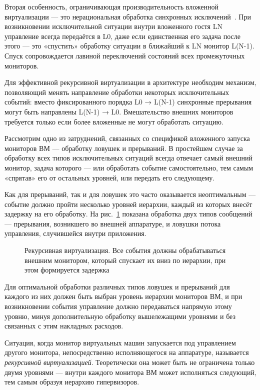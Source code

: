 Вторая особенность, ограничивающая производительность вложенной виртуализации — это нерациональная обработка синхронных исключений . При возникновении исключительной ситуации внутри вложенного гостя LN управление всегда передаётся в L0, даже если единственная его задача после этого — это «спустить» обработку ситуации в ближайший к LN монитор L(N-1). Спуск сопровождается лавиной переключений состояний всех промежуточных мониторов.


Для эффективной рекурсивной виртуализации в архитектуре необходим механизм, позволяющий менять направление обработки некоторых исключительных событий: вместо фиксированного порядка L0 → L(N-1) синхронные прерывания могут быть направлены L(N-1) → L0. Вмешательство внешних мониторов требуется только если более вложенные не могут обработать ситуацию.

Рассмотрим одно из затруднений, связанных со спецификой вложенного запуска мониторов ВМ --- обработку ловушек и прерываний.
В простейшем случае за обработку всех типов исключительных ситуаций всегда отвечает самый внешний монитор, задача которого --- или обработать событие самостоятельно, тем самым «спрятав» его от остальных уровней, или передать его следующему.

Как для прерываний, так и для ловушек это часто оказывается неоптимальным --- событие должно пройти несколько уровней иерархии, каждый из которых внесёт задержку на его обработку. На рис.~\ref{fig:recursive-vm} показана обработка двух типов сообщений --- прерывания, возникшего во внешней аппаратуре, и ловушки потока управления, случившейся внутри приложения.

\begin{figure}[htb]
    \centering
    \caption[Рекурсивная виртуализация]{Рекурсивная виртуализация. Все события должны обрабатываться внешним монитором, который спускает их вниз по иерархии, при этом формируется задержка}
    \label{fig:recursive-vm}
\end{figure}

Для оптимальной обработки различных типов ловушек и прерываний для каждого из них должен быть выбран уровень иерархии мониторов ВМ, и при возникновении события управление должно передаваться напрямую этому уровню, минуя дополнительную обработку вышележащими уровнями и без связанных с этим накладных расходов.



Ситуация, когда монитор виртуальных машин запускается под управлением другого монитора, непосредственно исполняющегося на аппаратуре, называется \textit{рекурсивной виртуализацией}. Теоретически она может быть не ограничена только двумя уровнями --- внутри каждого монитора ВМ может исполняться следующий, тем самым образуя иерархию гипервизоров.

